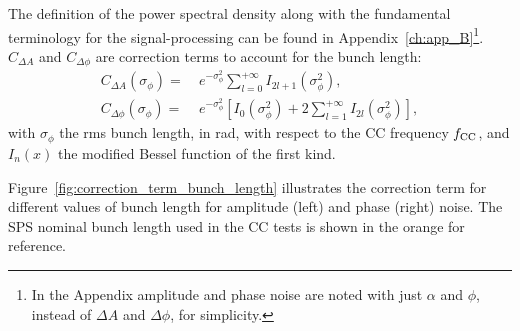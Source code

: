 The definition of the power spectral density along with the fundamental terminology for the signal-processing can be found in Appendix~\ref{ch:app_B}\footnote{In the Appendix amplitude and phase noise are noted with just $\alpha$ and $\phi$, instead of $\Delta A$ and $\Delta \phi$, for simplicity.}.
$C_{\Delta A}$ and $C_{\Delta \phi}$ are correction terms to account for the bunch length:
\begin{align}
C_{\Delta A}(\sigma_{\phi}) = ~& e^{-\sigma_{\phi}^2}\sum_{l=0}^{+\infty} I_{2l+1}(\sigma_{\phi}^2),\\
C_{\Delta \phi}(\sigma_{\phi}) = ~& e^{-\sigma_{\phi}^2} \left[I_0(\sigma_{\phi}^2) + 2 \sum_{l=1}^{+\infty} I_{2l}(\sigma_{\phi}^2) \right],
\end{align}
with $\sigma_{\phi}$ the rms bunch length, in rad, with respect to the CC frequency ${f_\mathrm{CC}}$, and $I_n(x)$ the modified Bessel function of the first kind. 

Figure~\ref{fig:correction_term_bunch_length} illustrates the correction term for different values of bunch length for amplitude (left) and phase (right) noise. The SPS nominal bunch length used in the CC tests is shown in the orange for reference.

